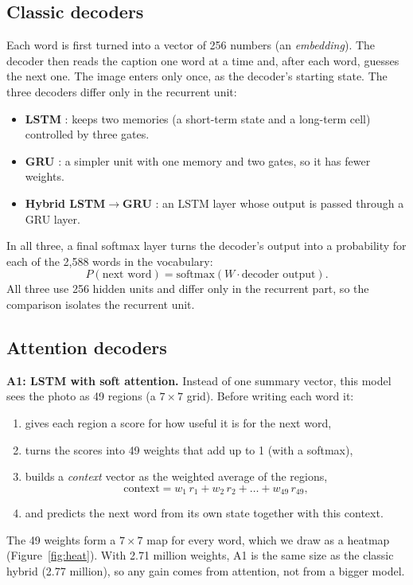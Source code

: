 \documentclass[11pt]{article}
\begin{document}
\subsection{Classic decoders}
Each word is first turned into a vector of 256 numbers (an \emph{embedding}). The decoder then reads the caption one word at a time and, after each word, guesses the next one. The image enters only once, as the decoder's starting state. The three decoders differ only in the recurrent unit:
\begin{itemize}
\item \textbf{LSTM} \cite{hochreiter1997}: keeps two memories (a short-term state and a long-term cell) controlled by three gates.
\item \textbf{GRU} \cite{cho2014}: a simpler unit with one memory and two gates, so it has fewer weights.
\item \textbf{Hybrid LSTM$\rightarrow$GRU} \cite{kavitha2025}: an LSTM layer whose output is passed through a GRU layer.
\end{itemize}
In all three, a final softmax layer turns the decoder's output into a probability for each of the 2,588 words in the vocabulary:
\begin{equation}
P(\text{next word}) = \mathrm{softmax}(W \cdot \text{decoder output}).
\end{equation}
All three use 256 hidden units and differ only in the recurrent part, so the comparison isolates the recurrent unit.

\subsection{Attention decoders}
\textbf{A1: LSTM with soft attention.} Instead of one summary vector, this model sees the photo as 49 regions (a $7\times7$ grid). Before writing each word it:
\begin{enumerate}
\item gives each region a score for how useful it is for the next word,
\item turns the scores into 49 weights that add up to 1 (with a softmax),
\item builds a \emph{context} vector as the weighted average of the regions,
\begin{equation}
\text{context} = w_1\,r_1 + w_2\,r_2 + \dots + w_{49}\,r_{49},
\end{equation}
\item and predicts the next word from its own state together with this context.
\end{enumerate}
The 49 weights form a $7\times7$ map for every word, which we draw as a heatmap (Figure~\ref{fig:heat}). With 2.71 million weights, A1 is the same size as the classic hybrid (2.77 million), so any gain comes from attention, not from a bigger model.
\end{document}
